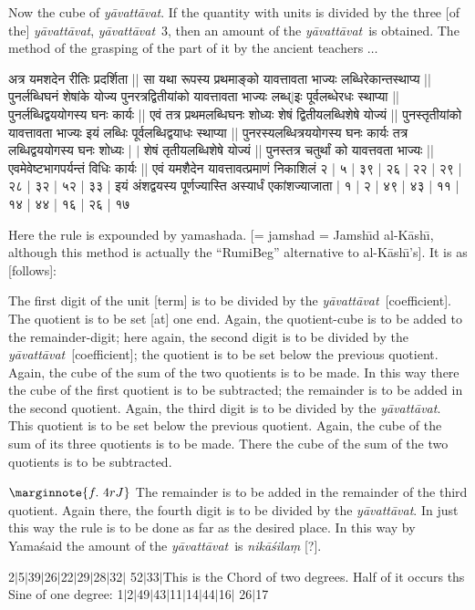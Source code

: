 \documentclass[12pt]{book}
\let\*=\d
\def\ya{\textit{y\=avat\-t\=avat}}
\def\elp{$\ldots$}
\def\danda{$|$}
\begin{document}
Now the cube of \ya.  If the quantity with units is divided by the three [of the] \ya,
\ya\ 3, 
then an amount of the \ya\ is obtained.    
The method of the grasping of the part of it 
by the ancient teachers \elp 

\newpage

{\s अत्र यमशदेन रीतिः प्रदर्शिता ||
सा यथा रूपस्य प्रथमाङ्को यावत्तावता भाज्यः लब्धिरेकान्तस्थाप्य || पुनर्लब्धिघनं शेषांके योज्य
पुनरत्रद्वितीयांको यावत्तावता भाज्यः लब्ध्$|$इः पूर्वलब्धेरधः स्थाप्या || पुनर्लब्धिद्वययोगस्य घनः
कार्यः || एवं तत्र प्रथमलब्धिघनः शोध्यः शेषं द्वितीयलब्धि\-शेषे योज्यं || पुनस्तृतीयांको
यावत्तावता भाज्यः इयं लब्धिः पूर्वलब्धिद्वयाधः स्थाप्या || पुनरस्यलब्धित्रययोगस्य घनः कार्यः
तत्र लब्धिद्वययोगस्य घनः शोध्यः | $|$ %
शेषं तृतीयलब्धिशेषे योज्यं || पुनस्तत्र चतुर्थां को यावत्तवता भाज्यः || एवमेवेष्टभागपर्यन्तं विधिः कार्यः ||
एवं यमशैदेन यावत्तावत्प्रमाणं निकाशिलं २ | ५ | ३९ | २६ | २२ | २९ | २८ | ३२ | ५२ | ३३ | इयं
अंशद्वयस्य पूर्णज्यास्ति अस्यार्धं एकांशज्याजाता | १ | २ | ४९ | ४३ | ११ | १४ | ४४ | १६ | २६ | १७} 

\newpage

Here the rule is expounded by yamashada. 
[= jamshad = Jamsh\={\i}d al-K\=ash\={\i}, although this method is actually
the ``RumiBeg'' alternative to al-K\=ash\={\i}'s]. It is as [follows]:

The first digit of the unit [term] is to be divided by the \ya\ [coefficient]. The quotient is to be set
[at] one end. Again, the quotient-cube is to be added to the remainder-digit;
here again, the second digit is to be divided by the \ya\ [coefficient]; the quotient is to be  set
below the previous quotient. Again, the cube of the sum of the two quotients
is to be made.  In this way there the cube of the first quotient is to be subtracted;
the remainder is to be added in the second quotient. Again, the third digit is to be
divided by the \ya. This quotient is to be set below the previous quotient. Again,
the cube of the sum of its three quotients is to be made. There the cube of
the sum of the two quotients is to be subtracted. 

$\marginnote{f.~4r J}$
The remainder is to be added in the remainder of the third quotient. Again there, the 
fourth digit is to be divided by the \ya. In just this way the rule is to be done as far
as the desired place. In this way by  Yama\'said the amount of the \ya\ is 
\textit{nik\=a\'sila\*m} [?].

2\danda 5\danda 39\danda 26\danda 22\danda 29\danda 28\danda 32\danda
52\danda 33\danda This is the Chord of two degrees. Half of it occurs ths
Sine of one degree: 
1\danda 2\danda 49\danda 43\danda 11\danda 14\danda 44\danda 16\danda
26\danda 17 
\end{document}
